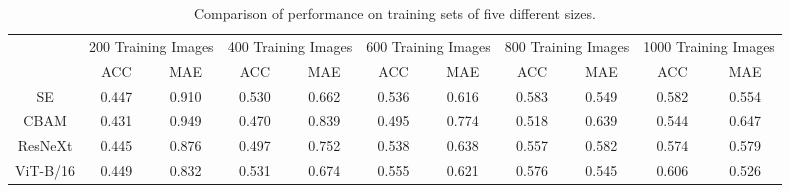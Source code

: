 \begin{table*}[h]
\caption{Comparison of performance on training sets of five different sizes.}
\label{sota_table}
\centering
\begin{tabular}{ccccccccccc}
\hline
               & \multicolumn{2}{c}{200 Training Images}                           & \multicolumn{2}{c}{400 Training Images}                           & \multicolumn{2}{c}{600 Training Images}                           & \multicolumn{2}{c}{800 Training Images}                           & \multicolumn{2}{c}{1000 Training Images}                          \\ \cline{2-11} 
               & ACC                             & MAE                             & ACC                             & MAE                             & ACC                             & MAE                             & ACC                             & MAE                             & ACC                             & MAE                             \\ \hline
SE             & 0.447                           & 0.910                           & 0.530                           & 0.662                           & 0.536                           & 0.616                           & 0.583                           & 0.549                           & 0.582                           & 0.554                           \\ \hline
CBAM           & 0.431                           & 0.949                           & 0.470                           & 0.839                           & 0.495                           & 0.774                           & 0.518                           & 0.639                           & 0.544                           & 0.647                           \\ \hline
ResNeXt        & 0.445                           & 0.876                           & 0.497                           & 0.752                           & 0.538                           & 0.638                           & 0.557                           & 0.582                           & 0.574                           & 0.579                           \\ \hline
ViT-B/16       & 0.449                           & 0.832                           & 0.531                           & 0.674                           & 0.555                           & 0.621                           & 0.576                           & 0.545                           & 0.606                           & 0.526                           \\ \hline

\end{tabular}
\end{table*}
